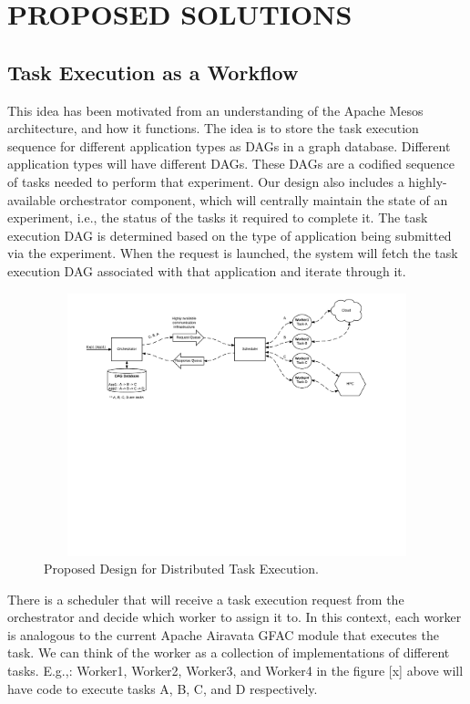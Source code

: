 \documentclass[sigconf]{acmart}
\begin{document}
\section{PROPOSED SOLUTIONS}

\subsection{Task Execution as a Workflow}
This idea has been motivated from an understanding of the Apache Mesos \cite{apacheMesos} architecture, and how it functions. The idea is to store the task execution sequence for different application types as DAGs in a graph database. Different application types will have different DAGs. These DAGs are a codified sequence of tasks needed to perform that experiment.  Our design also includes a highly-available orchestrator component, which will centrally maintain the state of an experiment, i.e., the status of the tasks it required to complete it. The task execution DAG is determined based on the type of application being submitted via the experiment.  When the request is launched, the system will fetch the task execution DAG associated with that application and iterate through it.

\begin{figure}
\includegraphics[height=3in, width=7in]{figures/overall-design.pdf}
\caption{Proposed Design for Distributed Task Execution.}
\end{figure}

There is a scheduler that will receive a task execution request from the orchestrator and decide which worker to assign it to. In this context, each worker  is analogous to the current Apache Airavata GFAC module that executes the task. We can think of the worker as a collection of implementations of different tasks. E.g.,: Worker1, Worker2, Worker3, and Worker4 in the figure [x] above will have code to execute tasks A, B, C, and D respectively.
\end{document}
